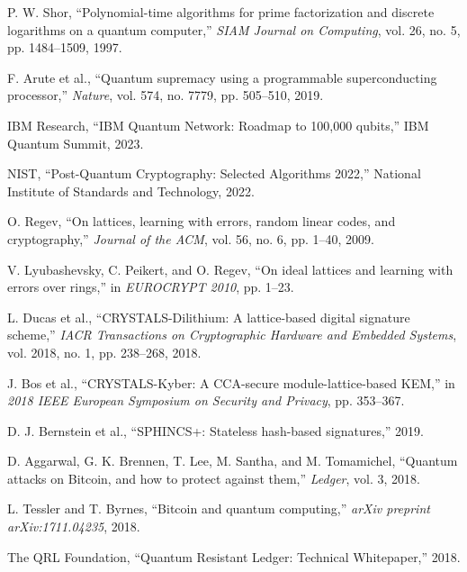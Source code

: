 \documentclass[12pt,a4paper]{article}
\begin{document}




\begin{thebibliography}{99}

P. W. Shor, ``Polynomial-time algorithms for prime factorization and discrete logarithms on a quantum computer,'' \textit{SIAM Journal on Computing}, vol. 26, no. 5, pp. 1484--1509, 1997.

F. Arute et al., ``Quantum supremacy using a programmable superconducting processor,'' \textit{Nature}, vol. 574, no. 7779, pp. 505--510, 2019.

IBM Research, ``IBM Quantum Network: Roadmap to 100,000 qubits,'' IBM Quantum Summit, 2023.

NIST, ``Post-Quantum Cryptography: Selected Algorithms 2022,'' National Institute of Standards and Technology, 2022.

O. Regev, ``On lattices, learning with errors, random linear codes, and cryptography,'' \textit{Journal of the ACM}, vol. 56, no. 6, pp. 1--40, 2009.

V. Lyubashevsky, C. Peikert, and O. Regev, ``On ideal lattices and learning with errors over rings,'' in \textit{EUROCRYPT 2010}, pp. 1--23.

L. Ducas et al., ``CRYSTALS-Dilithium: A lattice-based digital signature scheme,'' \textit{IACR Transactions on Cryptographic Hardware and Embedded Systems}, vol. 2018, no. 1, pp. 238--268, 2018.

J. Bos et al., ``CRYSTALS-Kyber: A CCA-secure module-lattice-based KEM,'' in \textit{2018 IEEE European Symposium on Security and Privacy}, pp. 353--367.

D. J. Bernstein et al., ``SPHINCS+: Stateless hash-based signatures,'' 2019.

D. Aggarwal, G. K. Brennen, T. Lee, M. Santha, and M. Tomamichel, ``Quantum attacks on Bitcoin, and how to protect against them,'' \textit{Ledger}, vol. 3, 2018.

L. Tessler and T. Byrnes, ``Bitcoin and quantum computing,'' \textit{arXiv preprint arXiv:1711.04235}, 2018.

The QRL Foundation, ``Quantum Resistant Ledger: Technical Whitepaper,'' 2018.


\end{thebibliography}
\end{document}
